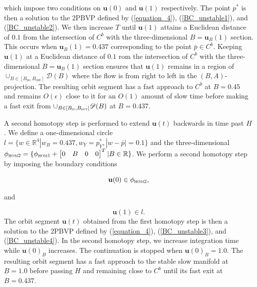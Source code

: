 \documentclass{ws-ijbc}
\begin{document}
\noindent
which impose two conditions on $\mathbf{u}(0)$ and $\mathbf{u}(1)$ respectively.  The point $p^*$ is then a solution to the 2PBVP defined by (\ref{equation_4}), (\ref{BC_unstable1}), and (\ref{BC_unstable2}).  We then increase $T$ until $\mathbf{u}(1)$ attains a Euclidean distance of $0.1$ from the intersection of $C^b$ with the three-dimensional $B = \mathbf{u}_B(1)$ section.  This occurs when $ \mathbf{u}_B(1) = 0.437$ corresponding to the point $\bar{p} \in C^b$.  Keeping $\mathbf{u}(1)$ at a Euclidean distance of $0.1$ rom the intersection of $C^b$ with the three-dimensional $B = \mathbf{u}_B(1)$ section ensures that $\mathbf{u}(1)$ remains in a region of $\cup_{B \in [B_{\mathrm{in}}, B_{\mathrm{out}}]}\mathscr{D}(B)$ where the flow is from right to left in the $(B,A)$-projection.  The resulting orbit segment has a fast approach to $C^b$ at $B=0.45$ and remains $O(\epsilon)$ close to it for an $O(1)$ amount of slow time before making a fast exit from $\cup_{B\in[B_{\textsc{in}}, B_{\textsc{out}}]} \mathscr{D}(B)$ at $B=0.437$.

A second homotopy step is performed to extend $\mathbf{u}(t)$ backwards in time past $H$.  We define a one-dimensional circle $l = \{w \in \mathbb{R}^4 | w_B = 0.437, w_Y =p^*_Y, |w-\bar{p}| = 0.1\}$ and the three-dimensional $\phi_{\textsc{hom2}} = \{\phi_{\textsc{hom1}} + \begin{bmatrix} 0 & B & 0 & 0 \end{bmatrix}^{T}| B \in \mathbb{R} \}$.  We perform a second homotopy step by imposing the boundary conditions

\begin{equation}
\mathbf{u}(0) \in \phi_{\textsc{hom2}},
\label{BC_unstable3}
\end{equation}

and

\begin{equation}
\mathbf{u}(1) \in l.
\label{BC_unstable4}
\end{equation}
\noindent
The orbit segment $\mathbf{u}(t)$ obtained from the first homotopy step is then a solution to the 2PBVP defined by (\ref{equation_4}), (\ref{BC_unstable3}), and (\ref{BC_unstable4}).  In the second homotopy step, we increase integration time while $\mathbf{u}(0)_B$ increases.  The continuation is stopped when $\mathbf{u}(0)_B=1.0$.  The resulting orbit segment has a fast approach to the stable slow manifold at $B=1.0$ before passing $H$ and remaining close to $C^b$ until its fast exit at $B = 0.437$.  
\end{document}
